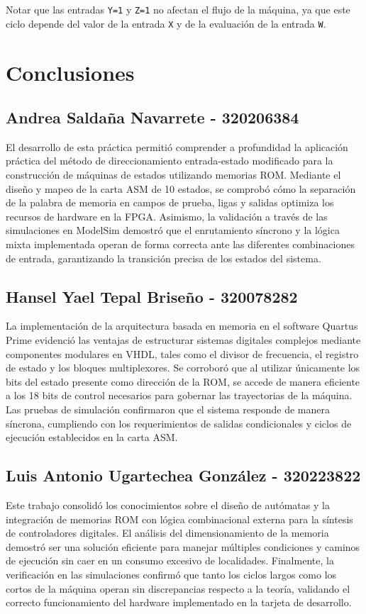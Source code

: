 \documentclass[12pt, letterpaper]{article}
\begin{document}
Notar que las entradas \texttt{Y=1} y \texttt{Z=1} no afectan el flujo de la máquina, ya que este ciclo depende del valor de la entrada \texttt{X} y de la evaluación de la entrada \texttt{W}.

\section*{Conclusiones}

\subsection*{Andrea Saldaña Navarrete - 320206384}

El desarrollo de esta práctica permitió comprender a profundidad la aplicación práctica del método de direccionamiento entrada-estado modificado para la construcción de máquinas de estados utilizando memorias ROM. Mediante el diseño y mapeo de la carta ASM de 10 estados, se comprobó cómo la separación de la palabra de memoria en campos de prueba, ligas y salidas optimiza los recursos de hardware en la FPGA. Asimismo, la validación a través de las simulaciones en ModelSim demostró que el enrutamiento síncrono y la lógica mixta implementada operan de forma correcta ante las diferentes combinaciones de entrada, garantizando la transición precisa de los estados del sistema.

\subsection*{Hansel Yael Tepal Briseño - 320078282}

La implementación de la arquitectura basada en memoria en el software Quartus Prime evidenció las ventajas de estructurar sistemas digitales complejos mediante componentes modulares en VHDL, tales como el divisor de frecuencia, el registro de estado y los bloques multiplexores. Se corroboró que al utilizar únicamente los bits del estado presente como dirección de la ROM, se accede de manera eficiente a los 18 bits de control necesarios para gobernar las trayectorias de la máquina. Las pruebas de simulación confirmaron que el sistema responde de manera síncrona, cumpliendo con los requerimientos de salidas condicionales y ciclos de ejecución establecidos en la carta ASM.

\subsection*{Luis Antonio Ugartechea González - 320223822}

Este trabajo consolidó los conocimientos sobre el diseño de autómatas y la integración de memorias ROM con lógica combinacional externa para la síntesis de controladores digitales. El análisis del dimensionamiento de la memoria demostró ser una solución eficiente para manejar múltiples condiciones y caminos de ejecución sin caer en un consumo excesivo de localidades. Finalmente, la verificación en las simulaciones confirmó que tanto los ciclos largos como los cortos de la máquina operan sin discrepancias respecto a la teoría, validando el correcto funcionamiento del hardware implementado en la tarjeta de desarrollo.


\end{document}
